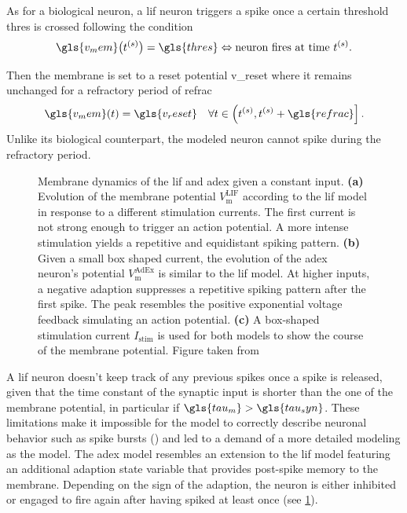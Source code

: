 As for a biological neuron, a \gls{lif} neuron triggers a spike once a certain threshold \gls{thres} is crossed following the condition
\begin{equation*}
\gls{v_mem}\big(t^{(s)}\big) = \gls{thres} \Leftrightarrow \text{neuron fires at time } t^{(s)}.
\end{equation*}

Then the membrane is set to a reset potential \gls{v_reset} where it remains unchanged for a refractory period of \gls{refrac}
\begin{equation*}
\gls{v_mem}(t) = \gls{v_reset} \quad \forall t \in \left(t^{(s)}, t^{(s)} + \gls{refrac}\right].
\end{equation*}
Unlike its biological counterpart, the modeled neuron cannot spike during the refractory period.

\begin{figure}[htb!]
	\centering
	\scalebox{0.93}{}
	\caption[Membrane dynamics of the \gls{lif} and \gls{adex} given a constant input.]{Membrane dynamics of the \gls{lif} and \gls{adex} given a constant input. \textbf{(a)} Evolution of the membrane potential $V_\text{m}^\text{LIF}$ according to the \gls{lif} model in response to a different stimulation currents. The first current is not strong enough to trigger an action potential. A more intense stimulation yields a repetitive and equidistant spiking pattern. \textbf{(b)} Given a small box shaped current, the evolution of the \gls{adex} neuron's potential $V_\text{m}^\text{AdEx}$ is similar to the \gls{lif} model. At higher inputs, a negative adaption suppresses a repetitive spiking pattern after the first spike. The peak resembles the positive exponential voltage feedback simulating an action potential. \textbf{(c)} A box-shaped stimulation current $I_\text{stim}$ is used for both models to show the course of the membrane potential. Figure taken from \citealp{stradmann2019msc}}
	\label{lifvsadex}
\end{figure}

A \gls{lif} neuron doesn't keep track of any previous spikes once a spike is released, given that the time constant of the synaptic input is shorter than the one of the membrane potential, in particular if $\gls{tau_m} > \gls{tau_syn}$. These limitations make it impossible for the model to correctly describe neuronal behavior such as spike bursts (\citealp{gerstner2014dynamics}) and led to a demand of a more detailed modeling as the  model. The \gls{adex} model resembles an extension to the \gls{lif} model featuring an additional adaption state variable that provides post-spike memory to the membrane. Depending on the sign of the adaption, the neuron is either inhibited or engaged to fire again after having spiked at least once (see \cref{lifvsadex}).

